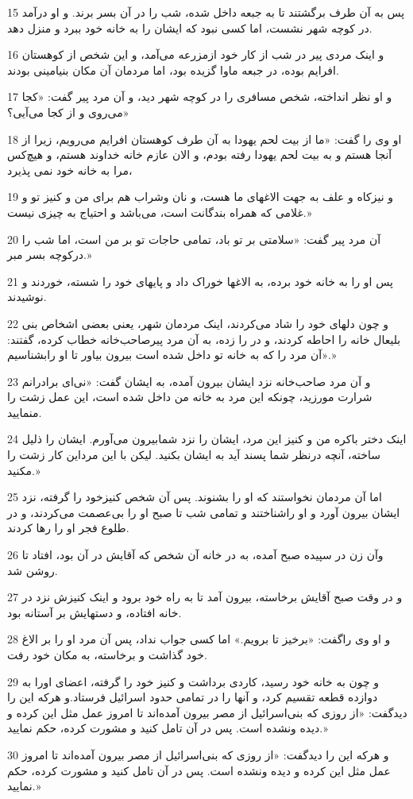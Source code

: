 \par 15 پس به آن طرف برگشتند تا به جبعه داخل شده، شب را در آن بسر برند. و او درآمد در کوچه شهر نشست، اما کسی نبود که ایشان را به خانه خود ببرد و منزل دهد.
\par 16 و اینک مردی پیر در شب از کار خود ازمزرعه می‌آمد، و این شخص از کوهستان افرایم بوده، در جبعه ماوا گزیده بود، اما مردمان آن مکان بنیامینی بودند.
\par 17 و او نظر انداخته، شخص مسافری را در کوچه شهر دید، و آن مرد پیر گفت: «کجا می‌روی و از کجا می‌آیی؟» 
\par 18 او وی را گفت: «ما از بیت لحم یهودا به آن طرف کوهستان افرایم می‌رویم، زیرا از آنجا هستم و به بیت لحم یهودا رفته بودم، و الان عازم خانه خداوند هستم، و هیچ‌کس مرا به خانه خود نمی پذیرد،
\par 19 و نیزکاه و علف به جهت الاغهای ما هست، و نان وشراب هم برای من و کنیز تو و غلامی که همراه بندگانت است، می‌باشد و احتیاج به چیزی نیست.»
\par 20 آن مرد پیر گفت: «سلامتی بر تو باد، تمامی حاجات تو بر من است، اما شب را درکوچه بسر مبر.»
\par 21 پس او را به خانه خود برده، به الاغها خوراک داد و پایهای خود را شسته، خوردند و نوشیدند.
\par 22 و چون دلهای خود را شاد می‌کردند، اینک مردمان شهر، یعنی بعضی اشخاص بنی بلیعال خانه را احاطه کردند، و در را زده، به آن مرد پیرصاحب‌خانه خطاب کرده، گفتند: «آن مرد را که به خانه تو داخل شده است بیرون بیاور تا او رابشناسیم.»
\par 23 و آن مرد صاحب‌خانه نزد ایشان بیرون آمده، به ایشان گفت: «نی‌ای برادرانم شرارت مورزید، چونکه این مرد به خانه من داخل شده است، این عمل زشت را منمایید.
\par 24 اینک دختر باکره من و کنیز این مرد، ایشان را نزد شمابیرون می‌آورم. ایشان را ذلیل ساخته، آنچه درنظر شما پسند آید به ایشان بکنید. لیکن با این مرداین کار زشت را مکنید.»
\par 25 اما آن مردمان نخواستند که او را بشنوند. پس آن شخص کنیزخود را گرفته، نزد ایشان بیرون آورد و او راشناختند و تمامی شب تا صبح او را بی‌عصمت می‌کردند، و در طلوع فجر او را رها کردند.
\par 26 وآن زن در سپیده صبح آمده، به در خانه آن شخص که آقایش در آن بود، افتاد تا روشن شد.
\par 27 و در وقت صبح آقایش برخاسته، بیرون آمد تا به راه خود برود و اینک کنیزش نزد در خانه افتاده، و دستهایش بر آستانه بود.
\par 28 و او وی راگفت: «برخیز تا برویم.» اما کسی جواب نداد، پس آن مرد او را بر الاغ خود گذاشت و برخاسته، به مکان خود رفت.
\par 29 و چون به خانه خود رسید، کاردی برداشت و کنیز خود را گرفته، اعضای اورا به دوازده قطعه تقسیم کرد، و آنها را در تمامی حدود اسرائیل فرستاد.و هر‌که این را دیدگفت: «از روزی که بنی‌اسرائیل از مصر بیرون آمده‌اند تا امروز عمل مثل این کرده و دیده ونشده است. پس در آن تامل کنید و مشورت کرده، حکم نمایید.»
\par 30 و هر‌که این را دیدگفت: «از روزی که بنی‌اسرائیل از مصر بیرون آمده‌اند تا امروز عمل مثل این کرده و دیده ونشده است. پس در آن تامل کنید و مشورت کرده، حکم نمایید.»
 
